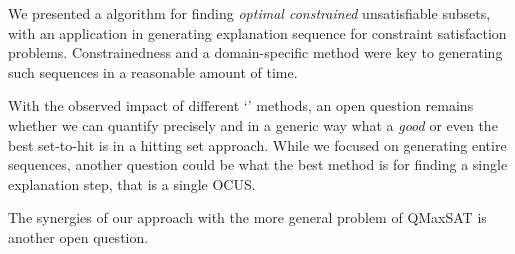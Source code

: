 We presented a \hitsetbased algorithm for finding \textit{optimal constrained} unsatisfiable subsets, with an application in generating explanation sequence for constraint satisfaction problems. Constrainedness and a domain-specific \grow method were key to generating such sequences in a reasonable amount of time.



With the observed impact of different `\grow' methods, an open question remains whether we can quantify precisely and in a generic way what a \textit{good} or even the best set-to-hit is in a hitting set approach. 
While we focused on generating entire sequences, another question could be what the best method is for finding a single explanation step, that is a single OCUS. 



The synergies of our approach with the more general problem of QMaxSAT \cite{DBLP:journals/constraints/IgnatievJM16} is another open question.



